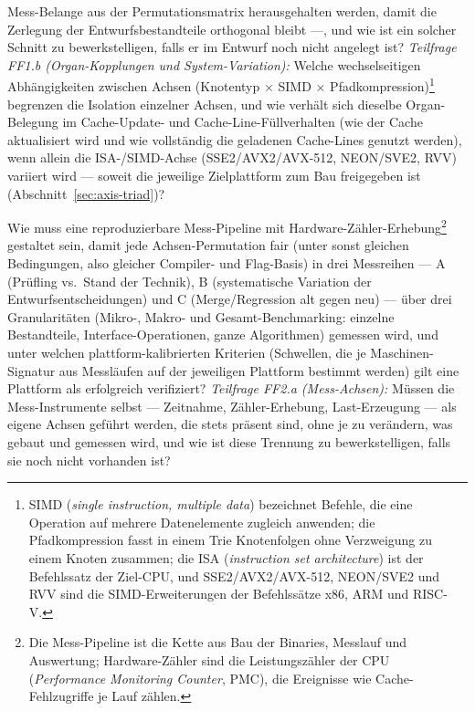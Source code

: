 \begin{description}
  Mess-Belange aus der Permutationsmatrix herausgehalten werden, damit die Zerlegung der
  Entwurfsbestandteile orthogonal bleibt ---, und wie ist ein solcher Schnitt zu bewerkstelligen,
  falls er im Entwurf noch nicht angelegt ist? \emph{Teilfrage FF1.b (Organ-Kopplungen und
  System-Variation):} Welche wechselseitigen Abhängigkeiten zwischen Achsen (Knotentyp $\times$ SIMD
  $\times$ Pfadkompression)\footnote{SIMD (\emph{single instruction, multiple data}) bezeichnet
  Befehle, die eine Operation auf mehrere Datenelemente zugleich anwenden; die Pfadkompression fasst
  in einem Trie Knotenfolgen ohne Verzweigung zu einem Knoten zusammen; die ISA (\emph{instruction
  set architecture}) ist der Befehlssatz der Ziel-CPU, und SSE2/AVX2/AVX-512, NEON/SVE2 und RVV sind
  die SIMD-Erweiterungen der Befehlssätze x86, ARM und RISC-V\@.}
  begrenzen die Isolation einzelner Achsen, und wie verhält sich dieselbe Organ-Belegung
  im Cache-Update- und Cache-Line-Füllverhalten (wie der Cache aktualisiert wird und wie vollständig
  die geladenen Cache-Lines genutzt werden), wenn allein die ISA-/SIMD-Achse (SSE2/AVX2/AVX-512,
  NEON/SVE2, RVV) variiert wird --- soweit die jeweilige Zielplattform zum Bau freigegeben ist
  (Abschnitt~\ref{sec:axis-triad})?
  \item[FF2 (Mess-Methodik)] Wie muss eine reproduzierbare Mess-Pipeline mit
  Hardware-Zähler-Erhebung\footnote{Die Mess-Pipeline ist die Kette aus Bau der Binaries, Messlauf
  und Auswertung; Hardware-Zähler sind die Leistungszähler der CPU (\emph{Performance Monitoring
  Counter}, PMC), die Ereignisse wie Cache-Fehlzugriffe je Lauf zählen.} gestaltet sein, damit jede
  Achsen-Permutation fair (unter sonst gleichen
  Bedingungen, also gleicher Compiler- und Flag-Basis) in drei Messreihen --- A (Prüfling vs.\ Stand der
  Technik), B (systematische Variation der Entwurfsentscheidungen) und C (Merge/Regression
  alt gegen neu) --- über drei Granularitäten (Mikro-, Makro- und Gesamt-Benchmarking: einzelne
  Bestandteile, Interface-Operationen, ganze Algorithmen) gemessen wird, und unter welchen
  plattform-kalibrierten Kriterien (Schwellen, die je Maschinen-Signatur aus Messläufen auf der
  jeweiligen Plattform bestimmt werden) gilt eine Plattform als erfolgreich verifiziert?
  \emph{Teilfrage FF2.a (Mess-Achsen):} Müssen die Mess-Instrumente selbst --- Zeitnahme,
  Zähler-Erhebung, Last-Erzeugung --- als eigene Achsen geführt werden, die stets präsent sind,
  ohne je zu verändern, was gebaut und gemessen wird, und wie ist diese Trennung zu
  bewerkstelligen, falls sie noch nicht vorhanden ist?

\end{description}
